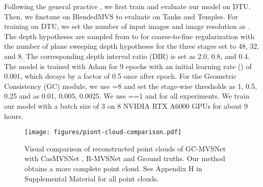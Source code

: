 \documentclass[10pt,twocolumn,letterpaper]{article}
\begin{document}
Following the general practice \cite{ding2022transmvsnet}, we first train
and evaluate our model on DTU. Then, we finetune on BlendedMVS to
evaluate on Tanks and Temples. For training on DTU, we set the number
of input images  and image resolution as . The
depth hypotheses are sampled from  to  for
coarse-to-fine regularization with the number of plane sweeping depth
hypotheses for the three stages set to 48, 32, and 8. The corresponding depth
interval ratio (DIR) is set as 2.0, 0.8, and 0.4. The model is trained
with Adam \cite{Kingma2014AdamAM} for 9 epochs with an initial
learning rate () of 0.001, which decays by a factor of 0.5
once after  epoch. For the Geometric Consistency (GC) module, we use =8 and set
the stage-wise thresholds  as 1, 0.5, 0.25 and  as
0.01, 0.005, 0.0025. We use ==1 and  for all experiments. We train our model with a batch size of 3 on 8
NVIDIA RTX A6000 GPUs for about 9 hours.





\begin{figure*}[t]
\begin{center}
    \vspace{-10pt}
    \texttt{[image: figures/piont-cloud-comparison.pdf]}
    \vspace{-15pt}
    \caption{Visual comparison of reconstructed point clouds of GC-MVSNet with CasMVSNet \cite{gu2019casmvsnet}, R-MVSNet \cite{yao2019recurrent} and Ground truths. Our method obtains a more complete point cloud. See Appendix H in Supplemental Material for all point clouds.}
    \label{fig:point-cloud-comparison}
    \vspace{-17pt}
\end{center}
\end{figure*}
\end{document}
